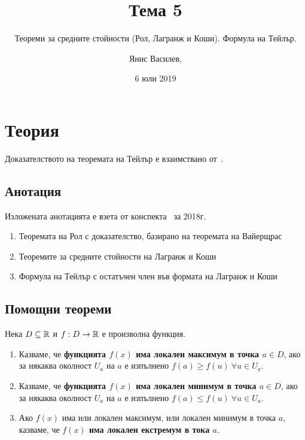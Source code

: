 \documentclass[numbers=endperiod, bibliography=totocnumbered]{scrartcl}
\title{Тема 5}
\subtitle{Теореми за средните стойности (Рол, Лагранж и Коши). Формула на Тейлър.}
\author{Янис Василев, \Email{ianis@ivasilev.net}}
\date{6 юли 2019}
\begin{document}
\maketitle

\section{Теория}

Доказателството на теоремата на Тейлър е взаимствано от~\cite{Fichtenholz}.

\subsection{Анотация}

Изложената анотацията е взета от конспекта~\cite{Syllabus} за 2018г.

\begin{enumerate}
  \item Теоремата на Рол с доказателство, базирано на теоремата на Вайерщрас
  \item Теоремите за средните стойности на Лагранж и Коши
  \item Формула на Тейлър с остатъчен член във формата на Лагранж и Коши
\end{enumerate}

\subsection{Помощни теореми}

\begin{definition}
  Нека \( D \subseteq \mathbb{R} \) и \( f: D \to \mathbb{R} \) е произволна функция.

  \begin{enumerate}
    \item Казваме, че \textbf{функцията \( f(x) \) има локален максимум в точка \( a \in D \)}, ако за някаква околност \( U_a \) на \( a \) е изпълнено \( f(a) \geq f(u)~\forall u \in U_a \).

    \item Казваме, че \textbf{функцията \( f(x) \) има локален минимум в точка \( a \in D \)}, ако за някаква околност \( U_a \) на \( a \) е изпълнено \( f(a) \leq f(u)~\forall u \in U_a \).

    \item Ако \( f(x) \) има или локален максимум, или локален минимум в точка \( a \), казваме, че \textbf{\( f(x) \) има локален екстремум в тока \( a \)}.
  \end{enumerate}
\end{definition}
\end{document}
